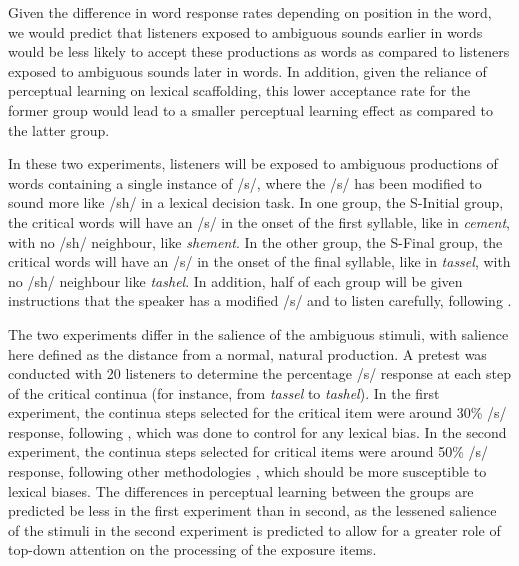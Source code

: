 \documentclass[11pt]{article} %
\begin{document}
Given the difference in word response rates depending on position in the word, we would predict that listeners exposed to ambiguous sounds earlier in words would be less likely to accept these productions as words as compared to listeners exposed to ambiguous sounds later in words.  In addition, given the reliance of perceptual learning on lexical scaffolding, this lower acceptance rate for the former group would lead to a smaller perceptual learning effect as compared to the latter group.

In these two experiments, listeners will be exposed to ambiguous productions of words containing a single instance of /s/, where the /s/ has been modified to sound more like /sh/ in a lexical decision task.  In one group, the S-Initial group, the critical words will have an /s/ in the onset of the first syllable, like in \emph{cement}, with no /sh/ neighbour, like \emph{shement}.  In the other group, the S-Final group, the critical words will have an /s/ in the onset of the final syllable, like in \emph{tassel}, with no /sh/ neighbour like \emph{tashel}.  In addition, half of each group will be given instructions that the speaker has a modified /s/ and to listen carefully, following \citet{PittSzostak2012}.

The two experiments differ in the salience of the ambiguous stimuli, with salience here defined as the distance from a normal, natural production.  A pretest was conducted with 20 listeners to determine the percentage /s/ response at each step of the critical continua (for instance, from \emph{tassel} to \emph{tashel}).  In the first experiment, the continua steps selected for the critical item  were around 30\% /s/ response, following \citet{ReinischWeberMitterer2013}, which was done to control for any lexical bias.  In the second experiment, the continua steps selected for critical items were around 50\% /s/ response, following other methodologies \citep{NorrisEtAl2003,KraljicSamuel2005}, which should be more susceptible to lexical biases.  The differences in perceptual learning between the groups are predicted be less in the first experiment than in second, as the lessened salience of the stimuli in the second experiment is predicted to allow for a greater role of top-down attention on the processing of the exposure items.
\end{document}
